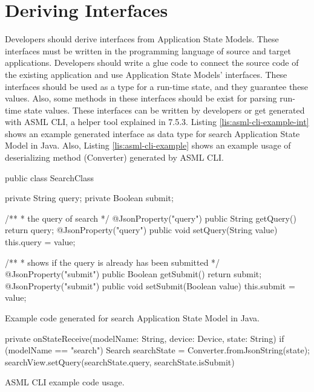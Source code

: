 \section{Deriving Interfaces}
Developers should derive interfaces from Application State Models. These interfaces must be written in the programming language of source and target applications. Developers should write a glue code to connect the source code of the existing application and use Application State Models' interfaces. These interfaces should be used as a type for a run-time state, and they guarantee these values. Also, some methods in these interfaces should be exist for parsing run-time state values. These interfaces can be written by developers or get generated with ASML CLI, a helper tool explained in 7.5.3. Listing \ref{lis:asml-cli-example-int} shows an example generated interface as data type for search Application State Model in Java. Also, Listing \ref{lis:asml-cli-example} shows an example usage of deserializing method (Converter) generated by ASML CLI.

\FloatBarrier
\begin{code}
\begin{java}
public class SearchClass {
    private String query;
    private Boolean submit;

    /**
     * the query of search
     */
    @JsonProperty("query")
    public String getQuery() { return query; }
    @JsonProperty("query")
    public void setQuery(String value) { this.query = value; }

    /**
     * shows if the query is already has been submitted
     */
    @JsonProperty("submit")
    public Boolean getSubmit() { return submit; }
    @JsonProperty("submit")
    public void setSubmit(Boolean value) { this.submit = value; }
}

\end{java}
\caption{Example code generated for search Application State Model in Java.}
\label{lis:asml-cli-example-int}
\end{code}
\FloatBarrier

\FloatBarrier
\begin{code}
\begin{javas}
private onStateReceive(modelName: String, device: Device, state: String) {
    if (modelName == "search") {
        Search searchState = Converter.fromJsonString(state);
        searchView.setQuery(searchState.query, searchState.isSubmit)
    }
}
\end{javas}
\caption{ASML CLI example code usage.}
\label{lis:asml-cli-example}
\end{code}
\FloatBarrier


